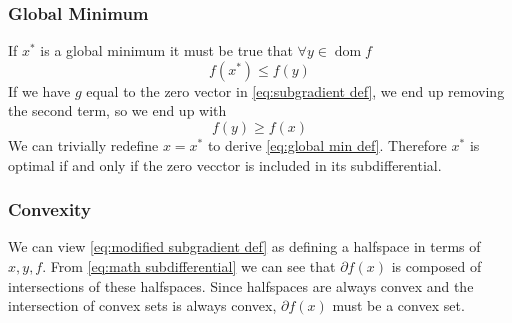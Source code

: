 \documentclass[conference]{IEEEtran}
\DeclareMathOperator{\dom}{dom}
\begin{document}
\subsubsection{Global Minimum}
If \(x^*\) is a global minimum it must be true that \(\forall y \in \dom f\)
\begin{equation}\label{eq:global min def}
f(x^*) \leq f(y)
\end{equation}
If we have \(g\) equal to the zero vector in \eqref{eq:subgradient def}, we end up removing the second term, so we end up with
\begin{equation}\label{eq:zero vector subgradient}
f(y) \geq f(x)
\end{equation}
We can trivially redefine \(x = x^*\) to derive \eqref{eq:global min def}. Therefore \(x^*\) is optimal if and only if the zero vecctor is included in its subdifferential.

\subsubsection{Convexity}
We can view \eqref{eq:modified subgradient def} as defining a halfspace in terms of \(x, y, f\). From \eqref{eq:math subdifferential} we can see that \(\partial f(x)\) is composed of intersections of these halfspaces. Since halfspaces are always convex and the intersection of convex sets is always convex, \(\partial f(x)\) must be a convex set.



\end{document}

